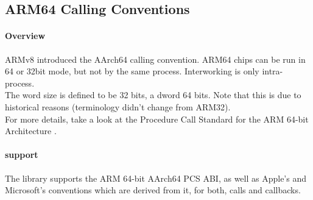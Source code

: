 %
%
%
%

\subsection{ARM64 Calling Conventions}

\paragraph{Overview}

ARMv8 introduced the AArch64 calling convention. ARM64 chips can be run in 64 or 32bit mode, but not by the same process. Interworking is only intra-process.\\
The word size is defined to be 32 bits, a dword 64 bits. Note that this is due to historical reasons (terminology didn't change from ARM32).\\
For more details, take a look at the Procedure Call Standard for the ARM 64-bit Architecture \cite{AAPCS64}.\\

\paragraph{ support}

The  library supports the ARM 64-bit AArch64 PCS ABI, as well as Apple's and Microsoft's conventions which are derived from it, for both, calls and callbacks.


